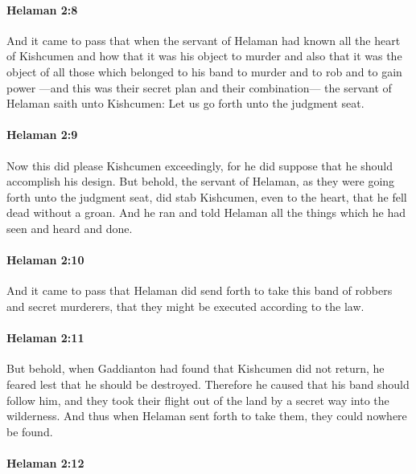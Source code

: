 		\paragraph{Helaman 2:8} %
			\label{HELAMAN-2-8}

			And it came to pass that
			when the servant of Helaman had known all the heart of Kishcumen
			and how that it was his object to murder
			and also that it was the object of all those which belonged to his band
			to murder and to rob and to gain power
			---and this was their secret plan and their combination---
			the servant of Helaman saith unto Kishcumen:
			Let us go forth unto the judgment seat.

		\paragraph{Helaman 2:9} %
			\label{HELAMAN-2-9}

			Now this did please Kishcumen exceedingly,
			for he did suppose that he should accomplish his design.
			But behold, the servant of Helaman,
			as they were going forth unto the judgment seat,
			did stab Kishcumen, even to the heart,
			that he fell dead without a groan.
			And he ran and told Helaman all the things
			which he had seen and heard and done.

		\paragraph{Helaman 2:10} %
			\label{HELAMAN-2-10}

			And it came to pass that Helaman did send forth
			to take this band of robbers and secret murderers,
			that they might be executed according to the law.

		\paragraph{Helaman 2:11} %
			\label{HELAMAN-2-11}

			But behold, when Gaddianton had found that Kishcumen did not return,
			he feared lest that he should be destroyed.
			Therefore he caused that his band should follow him,
			and they took their flight out of the land by a secret way into the wilderness.
			And thus when Helaman sent forth to take them,
			they could nowhere be found.

		\paragraph{Helaman 2:12} %
			\label{HELAMAN-2-12}

